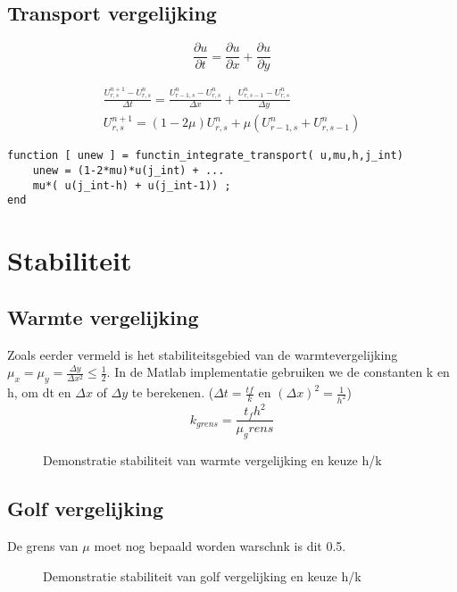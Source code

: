 \documentclass[11pt]{article} %
\begin{document}
	\subsection{Transport vergelijking}
		\begin{equation}
			\frac{\partial u}{\partial t} = \frac{\partial u}{\partial x} + \frac{\partial u}{\partial y}
		\end{equation}
		
		\begin{eqnarray}
			\frac{U_{r,s}^{n+1} - U_{r,s}^n}{\Delta t} = 
			\frac{U^n_{r-1,s} -U^n_{r,s}}{\Delta x} +
			\frac{U^n_{r,s-1} -U^n_{r,s}}{\Delta y} \\
			U_{r,s}^{n+1} = (1- 2 \mu)U^n_{r,s} + \mu (U^n_{r-1,s}+U^n_{r,s-1})
		\end{eqnarray}
\begin{lstlisting}[caption=Code Explicit Euler,label={lst:expl_euler}]
function [ unew ] = functin_integrate_transport( u,mu,h,j_int)
	unew = (1-2*mu)*u(j_int) + ... 
	mu*( u(j_int-h) + u(j_int-1)) ;
end
\end{lstlisting}
\clearpage
\section{Stabiliteit}
	\subsection{Warmte vergelijking}
	Zoals eerder vermeld is het stabiliteitsgebied van de warmtevergelijking  $\mu_x=\mu_y=\frac{\Delta y}{\Delta x^2} \leq \frac{1}{2}$. In de Matlab implementatie gebruiken we de constanten k en h, om dt en $\Delta x$ of $\Delta y$ te berekenen. ($\Delta t=\frac{tf}{k}$ en $(\Delta x)^2 = \frac{1}{h^2}$)
	\begin{equation}
		k_{grens} = \frac{t_f h^2}{\mu_grens}
	\end{equation}
	\begin{figure}[H]
		\centering
		\hfill
	\caption{Demonstratie stabiliteit van warmte vergelijking en keuze h/k}
	\end{figure}
	
	\subsection{Golf vergelijking}
	De grens van $\mu$ moet nog bepaald worden warschnk is dit 0.5.
	\begin{figure}[H]
		\centering
		\hfill
		\caption{Demonstratie stabiliteit van golf vergelijking en keuze h/k}
	\end{figure}
\end{document}
